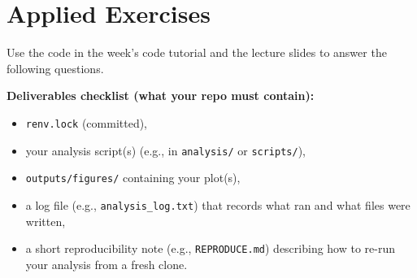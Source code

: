 \documentclass[11pt]{article}
\begin{document}
\section*{Applied Exercises}
Use the code in the week's code tutorial and the lecture slides to answer the following questions.\bigskip

\noindent \textbf{Deliverables checklist (what your repo must contain):}
\begin{itemize}
  \item \texttt{renv.lock} (committed),
  \item your analysis script(s) (e.g., in \texttt{analysis/} or \texttt{scripts/}),
  \item \texttt{outputs/figures/} containing your plot(s),
  \item a log file (e.g., \texttt{analysis\_log.txt}) that records what ran and what files were written,
  \item a short reproducibility note (e.g., \texttt{REPRODUCE.md}) describing how to re-run your analysis from a fresh clone.
\end{itemize}
\end{document}
